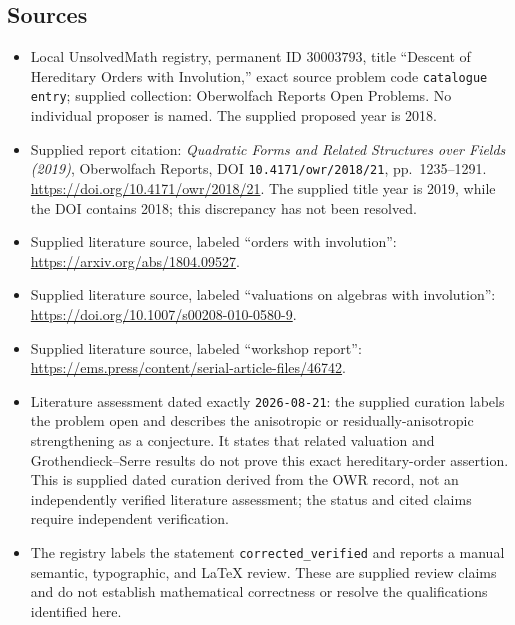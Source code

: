 \documentclass[11pt]{article}
\begin{document}
\subsection{Sources}
\begin{itemize}
\item Local UnsolvedMath registry, permanent ID \(30003793\), title ``Descent of Hereditary Orders with Involution,'' exact source problem code \texttt{catalogue entry}; supplied collection: Oberwolfach Reports Open Problems. No individual proposer is named. The supplied proposed year is 2018.
\item Supplied report citation: \emph{Quadratic Forms and Related Structures over Fields (2019)}, Oberwolfach Reports, DOI \texttt{10.4171/owr/2018/21}, pp.\ 1235--1291. \url{https://doi.org/10.4171/owr/2018/21}. The supplied title year is 2019, while the DOI contains 2018; this discrepancy has not been resolved.
\item Supplied literature source, labeled ``orders with involution'': \url{https://arxiv.org/abs/1804.09527}.
\item Supplied literature source, labeled ``valuations on algebras with involution'': \url{https://doi.org/10.1007/s00208-010-0580-9}.
\item Supplied literature source, labeled ``workshop report'': \url{https://ems.press/content/serial-article-files/46742}.
\item Literature assessment dated exactly \texttt{2026-08-21}: the supplied curation labels the problem open and describes the anisotropic or residually-anisotropic strengthening as a conjecture. It states that related valuation and Grothendieck--Serre results do not prove this exact hereditary-order assertion. This is supplied dated curation derived from the OWR record, not an independently verified literature assessment; the status and cited claims require independent verification.
\item The registry labels the statement \texttt{corrected\_verified} and reports a manual semantic, typographic, and LaTeX review. These are supplied review claims and do not establish mathematical correctness or resolve the qualifications identified here.
\end{itemize}
\end{document}
